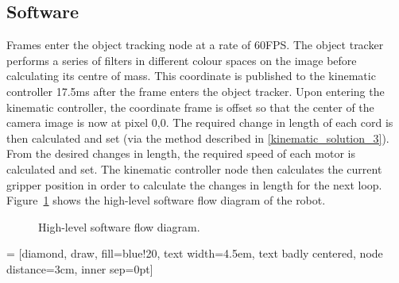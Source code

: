 \documentclass[conference]{IEEEtran}
\begin{document}
\subsection{Software}
Frames enter the object tracking node at a rate of 60FPS. The object tracker performs a series of filters in different colour spaces on the image before calculating its centre of mass. This coordinate is published to the kinematic controller 17.5ms after the frame enters the object tracker. Upon entering the kinematic controller, the coordinate frame is offset so that the center of the camera image is now at pixel 0,0. The required change in length of each cord is then calculated and set (via the method described in \ref{kinematic_solution_3}). From the desired changes in length, the required speed of each motor is calculated and set. The kinematic controller node then calculates the current gripper position in order to calculate the changes in length for the next loop.
Figure~\ref{fig:HighLevelDiagram} shows the high-level software flow diagram of the robot.
\begin{figure}[htbp]
	\centerline{%
	}
	\caption{High-level software flow diagram.}
	\label{fig:HighLevelDiagram}
	\end{figure}
	

	 = [diamond, draw, fill=blue!20, 
	text width=4.5em, text badly centered, node distance=3cm, inner sep=0pt]
	
\end{document}
